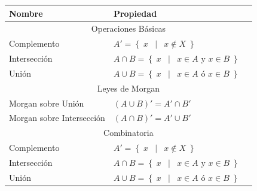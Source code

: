 \documentclass[12pt, fleqn]{report}                             %
\DeclareMathOperator \Space {\quad}                             %
\DeclareMathOperator \MiniSpace {\;}                            %
\newcommand \Such {\MiniSpace | \MiniSpace}                     %
\theoremstyle{break}                                            %
\newcommand{\Set}[1]{\left\{ \; #1 \; \right\}}                 %
\begin{document}
            \begin{table}[ht]
                \begin{tabular}{|m{16em}|m{16em}|@{}m{0pt}@{}}
                    \hline
                    \large{Nombre}          & \large{Propiedad}                             &\\[2em]    \hline\hline

                    \multicolumn{3}{|c|}{Operaciones Básicas}                                \\         \hline
                    Complemento  & $A' = \Set{x \Such x \notin X}$                          &\\[1em]    \hline
                    Intersección & $A \cap B = \Set{x \Such x \in A \text{ y } x \in B}$    &\\[1em]    \hline
                    Unión        & $A \cup B = \Set{x \Such x \in A \text{ ó } x \in B}$    &\\[1em]    \hline\hline

                    \multicolumn{3}{|c|}{Leyes de Morgan}                                    \\         \hline
                    Morgan sobre Unión          & $(A \cup B)' = A' \cap B'$                &\\[1em]    \hline
                    Morgan sobre Intersección   & $(A \cap B)' = A' \cup B'$                &\\[1em]    \hline\hline

                    \multicolumn{3}{|c|}{Combinatoria}                                       \\         \hline
                    Complemento  & $A' = \Set{x \Such x \notin X}$                          &\\[1em]    \hline
                    Intersección & $A \cap B = \Set{x \Such x \in A \text{ y } x \in B}$    &\\[1em]    \hline
                    Unión        & $A \cup B = \Set{x \Such x \in A \text{ ó } x \in B}$    &\\[1em]    \hline\hline
                  
                \end{tabular}
            \end{table}



        \clearpage
\end{document}
